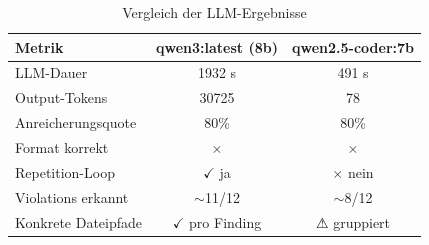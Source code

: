 \begin{table}[h]
\centering
\caption{Vergleich der LLM-Ergebnisse}
\label{tab:llm_vergleich}
\begin{tabular}{lcc}
\toprule
\textbf{Metrik} & \textbf{qwen3:latest (8b)} & \textbf{qwen2.5-coder:7b} \\
\midrule
LLM-Dauer        & 1932 s      & 491 s \\
Output-Tokens    & 30725       & 78 \\
Anreicherungsquote & 80\%     & 80\% \\
Format korrekt   & $\times$    & $\times$ \\
Repetition-Loop  & $\checkmark$ ja & $\times$ nein \\
Violations erkannt & $\sim$11/12 & $\sim$8/12 \\
Konkrete Dateipfade & $\checkmark$ pro Finding & $\warning$ gruppiert \\
\bottomrule
\end{tabular}
\end{table}

